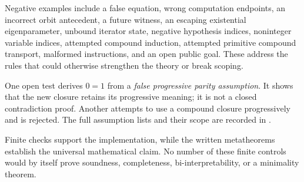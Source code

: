 Negative examples include a false equation, wrong computation endpoints,
an incorrect orbit antecedent, a future witness, an escaping existential
eigenparameter, unbound iterator state, negative hypothesis indices,
noninteger variable indices, attempted compound induction, attempted
primitive compound transport, malformed instructions, and an open public
goal. These address the rules that could otherwise strengthen the theory
or break scoping.

One open test derives $0=1$ from a \emph{false progressive parity
assumption}. It shows that the new closure retains its progressive
meaning; it is not a closed contradiction proof. Another attempts to use
a compound closure progressively and is rejected. The full assumption
lists and their scope are recorded in .

Finite checks support the implementation, while the written
metatheorems establish the universal mathematical claim. No number of
these finite controls would by itself prove soundness, completeness,
bi-interpretability, or a minimality theorem.

